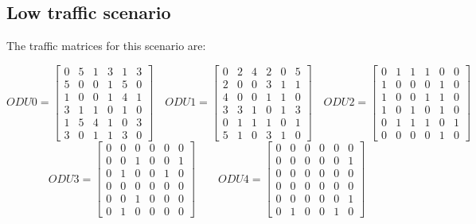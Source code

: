 \subsection{Low traffic scenario}\label{low_traffic_scenario}

The traffic matrices for this scenario are:

\[
ODU0=
  \begin{bmatrix}
    0 & 5 & 1 & 3 & 1 & 3 \\
    5 & 0 & 0 & 1 & 5 & 0 \\
    1 & 0 & 0 & 1 & 4 & 1 \\
    3 & 1 & 1 & 0 & 1 & 0 \\
    1 & 5 & 4 & 1 & 0 & 3 \\
    3 & 0 & 1 & 1 & 3 & 0
  \end{bmatrix}
\quad ODU1=
  \begin{bmatrix}
    0 & 2 & 4 & 2 & 0 & 5 \\
    2 & 0 & 0 & 3 & 1 & 1 \\
    4 & 0 & 0 & 1 & 1 & 0 \\
    3 & 3 & 1 & 0 & 1 & 3 \\
    0 & 1 & 1 & 1 & 0 & 1 \\
    5 & 1 & 0 & 3 & 1 & 0
  \end{bmatrix}
\quad ODU2=
  \begin{bmatrix}
    0 & 1 & 1 & 1 & 0 & 0 \\
    1 & 0 & 0 & 0 & 1 & 0 \\
    1 & 0 & 0 & 1 & 1 & 0 \\
    1 & 0 & 1 & 0 & 1 & 0 \\
    0 & 1 & 1 & 1 & 0 & 1 \\
    0 & 0 & 0 & 0 & 1 & 0
  \end{bmatrix}
\]
\[
ODU3=
  \begin{bmatrix}
    0 & 0 & 0 & 0 & 0 & 0 \\
    0 & 0 & 1 & 0 & 0 & 1 \\
    0 & 1 & 0 & 0 & 1 & 0 \\
    0 & 0 & 0 & 0 & 0 & 0 \\
    0 & 0 & 1 & 0 & 0 & 0 \\
    0 & 1 & 0 & 0 & 0 & 0
  \end{bmatrix}
\qquad ODU4=
  \begin{bmatrix}
    0 & 0 & 0 & 0 & 0 & 0 \\
    0 & 0 & 0 & 0 & 0 & 1 \\
    0 & 0 & 0 & 0 & 0 & 0 \\
    0 & 0 & 0 & 0 & 0 & 0 \\
    0 & 0 & 0 & 0 & 0 & 1 \\
    0 & 1 & 0 & 0 & 1 & 0
  \end{bmatrix}
\]


